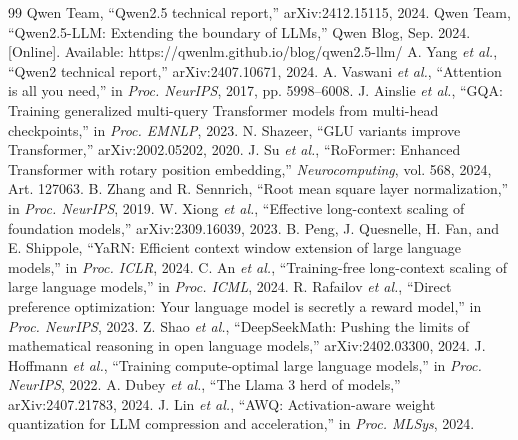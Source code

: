 \documentclass[conference]{IEEEtran}
\begin{document}
\begingroup
\scriptsize
\setlength{\itemsep}{0pt}
\begin{thebibliography}{99}
\setlength{\itemsep}{0pt}\setlength{\parskip}{0pt}
 Qwen Team, ``Qwen2.5 technical report,'' arXiv:2412.15115, 2024.
 Qwen Team, ``Qwen2.5-LLM: Extending the boundary of LLMs,'' Qwen Blog, Sep. 2024. [Online]. Available: https://qwenlm.github.io/blog/qwen2.5-llm/
 A. Yang \textit{et al.}, ``Qwen2 technical report,'' arXiv:2407.10671, 2024.
 A. Vaswani \textit{et al.}, ``Attention is all you need,'' in \textit{Proc. NeurIPS}, 2017, pp. 5998--6008.
 J. Ainslie \textit{et al.}, ``GQA: Training generalized multi-query Transformer models from multi-head checkpoints,'' in \textit{Proc. EMNLP}, 2023.
 N. Shazeer, ``GLU variants improve Transformer,'' arXiv:2002.05202, 2020.
 J. Su \textit{et al.}, ``RoFormer: Enhanced Transformer with rotary position embedding,'' \textit{Neurocomputing}, vol. 568, 2024, Art. 127063.
 B. Zhang and R. Sennrich, ``Root mean square layer normalization,'' in \textit{Proc. NeurIPS}, 2019.
 W. Xiong \textit{et al.}, ``Effective long-context scaling of foundation models,'' arXiv:2309.16039, 2023.
 B. Peng, J. Quesnelle, H. Fan, and E. Shippole, ``YaRN: Efficient context window extension of large language models,'' in \textit{Proc. ICLR}, 2024.
 C. An \textit{et al.}, ``Training-free long-context scaling of large language models,'' in \textit{Proc. ICML}, 2024.
 R. Rafailov \textit{et al.}, ``Direct preference optimization: Your language model is secretly a reward model,'' in \textit{Proc. NeurIPS}, 2023.
 Z. Shao \textit{et al.}, ``DeepSeekMath: Pushing the limits of mathematical reasoning in open language models,'' arXiv:2402.03300, 2024.
 J. Hoffmann \textit{et al.}, ``Training compute-optimal large language models,'' in \textit{Proc. NeurIPS}, 2022.
 A. Dubey \textit{et al.}, ``The Llama 3 herd of models,'' arXiv:2407.21783, 2024.
 J. Lin \textit{et al.}, ``AWQ: Activation-aware weight quantization for LLM compression and acceleration,'' in \textit{Proc. MLSys}, 2024.
\end{thebibliography}
\endgroup
\end{document}
